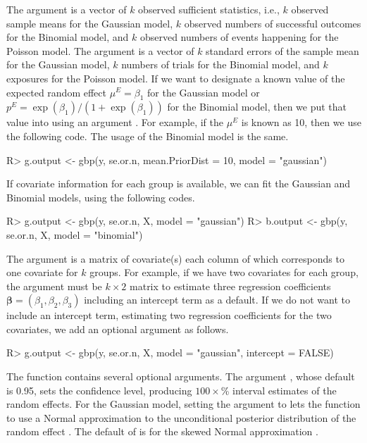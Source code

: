 \documentclass[article]{jss}
\begin{document}
The argument  is a vector of $k$ observed sufficient statistics, i.e., $k$ observed sample means for the Gaussian model, $k$ observed numbers of successful outcomes for the Binomial model, and $k$ observed numbers of events happening for the Poisson model. The argument   is a vector of $k$ standard errors of the sample mean for the Gaussian model, $k$ numbers of trials for the Binomial model, and $k$ exposures for the Poisson model. If we want to designate a known value of the expected random effect $\mu^E=\beta_1$ for the Gaussian model or $p^E=\exp(\beta_1)/(1+\exp(\beta_1))$ for the Binomial model, then we put that value into  using an argument . For example, if the $\mu^E$ is known as 10, then we use the following code. The usage of the Binomial model is the same.
\begin{CodeChunk}
\begin{CodeInput}
R> g.output <- gbp(y, se.or.n, mean.PriorDist = 10, model = "gaussian")
\end{CodeInput}
\end{CodeChunk}

If covariate information for each group is available, we can fit the Gaussian and Binomial models, using the following codes.
\begin{CodeChunk}
\begin{CodeInput}
R> g.output <- gbp(y, se.or.n, X, model = "gaussian")
R> b.output <- gbp(y, se.or.n, X, model = "binomial")
\end{CodeInput}
\end{CodeChunk}

The argument  is a matrix of covariate(s) each column of which corresponds to one covariate for $k$ groups. For example, if we have two covariates for each group, the argument  must be $k\times2$ matrix to estimate three regression coefficients $\boldsymbol{\beta}=(\beta_1, \beta_2, \beta_3)$ including an intercept term as a default. If we do not want to include an intercept term, estimating two regression coefficients for the two covariates, we add an optional argument  as follows.
\begin{CodeChunk}
\begin{CodeInput}
R> g.output <- gbp(y, se.or.n, X, model = "gaussian", intercept = FALSE)
\end{CodeInput}
\end{CodeChunk}

The function  contains several optional arguments. The argument , whose default is 0.95, sets the confidence level, producing $100\times$\% interval estimates of the random effects. For the Gaussian model, setting the argument  to  lets the function  to use a Normal approximation to the unconditional posterior distribution of the random effect \citep{tang2011}. The default of  is  for the skewed Normal approximation \citep{kelly2014advances}. 
\end{document}
